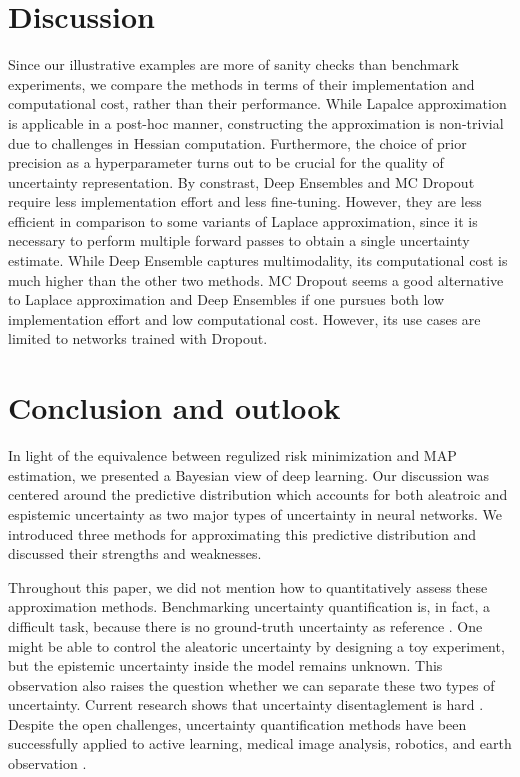 \section{Discussion}

Since our illustrative examples are more of sanity checks than benchmark experiments, we compare the methods in terms of their implementation and computational cost, rather than their performance. While Lapalce approximation is applicable in a post-hoc manner, constructing the approximation is non-trivial due to challenges in Hessian computation. Furthermore, the choice of prior precision as a hyperparameter turns out to be crucial for the quality of uncertainty representation. By constrast, Deep Ensembles and MC Dropout require less implementation effort and less fine-tuning. However, they are less efficient in comparison to some variants of Laplace approximation, since it is necessary to perform multiple forward passes to obtain a single uncertainty estimate. While Deep Ensemble captures multimodality, its computational cost is much higher than the other two methods. MC Dropout seems a good alternative to Laplace approximation and Deep Ensembles if one pursues both low implementation effort and low computational cost. However, its use cases are limited to networks trained with Dropout.

\section{Conclusion and outlook}

In light of the equivalence between regulized risk minimization and MAP estimation, we presented a Bayesian view of deep learning. Our discussion was centered around the predictive distribution which accounts for both aleatroic and espistemic uncertainty as two major types of uncertainty in neural networks. We introduced three methods for approximating this predictive distribution and discussed their strengths and weaknesses.

Throughout this paper, we did not mention how to quantitatively assess these approximation methods. Benchmarking uncertainty quantification is, in fact, a difficult task, because there is no ground-truth uncertainty as reference \citep{lakshminarayananSimpleScalablePredictive2017b}. One might be able to control the aleatoric uncertainty by designing a toy experiment, but the epistemic uncertainty inside the model remains unknown. This observation also raises the question whether we can separate these two types of uncertainty. Current research shows that uncertainty disentaglement is hard \citep{mucsanyiBenchmarkingUncertaintyDisentanglement2024a,wimmerQuantifyingAleatoricEpistemic2023}. Despite the open challenges, uncertainty quantification methods have been successfully applied to active learning, medical image analysis, robotics, and earth observation \citep{gawlikowskiSurveyUQ2023}.
